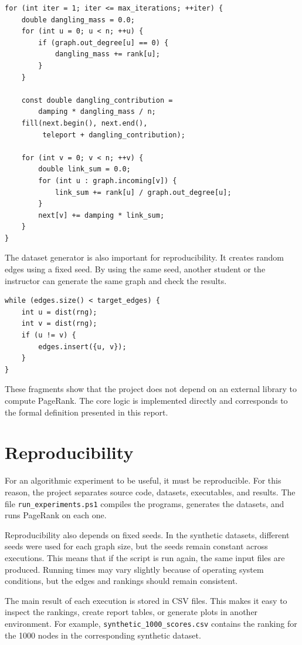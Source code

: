 \documentclass[runningheads]{llncs}
\begin{document}
\begin{verbatim}
for (int iter = 1; iter <= max_iterations; ++iter) {
    double dangling_mass = 0.0;
    for (int u = 0; u < n; ++u) {
        if (graph.out_degree[u] == 0) {
            dangling_mass += rank[u];
        }
    }

    const double dangling_contribution =
        damping * dangling_mass / n;
    fill(next.begin(), next.end(),
         teleport + dangling_contribution);

    for (int v = 0; v < n; ++v) {
        double link_sum = 0.0;
        for (int u : graph.incoming[v]) {
            link_sum += rank[u] / graph.out_degree[u];
        }
        next[v] += damping * link_sum;
    }
}
\end{verbatim}

The dataset generator is also important for reproducibility. It creates random edges using a fixed seed. By using the same seed, another student or the instructor can generate the same graph and check the results.

\begin{verbatim}
while (edges.size() < target_edges) {
    int u = dist(rng);
    int v = dist(rng);
    if (u != v) {
        edges.insert({u, v});
    }
}
\end{verbatim}

These fragments show that the project does not depend on an external library to compute PageRank. The core logic is implemented directly and corresponds to the formal definition presented in this report.

\section{Reproducibility}

For an algorithmic experiment to be useful, it must be reproducible. For this reason, the project separates source code, datasets, executables, and results. The file \texttt{run\_experiments.ps1} compiles the programs, generates the datasets, and runs PageRank on each one.

Reproducibility also depends on fixed seeds. In the synthetic datasets, different seeds were used for each graph size, but the seeds remain constant across executions. This means that if the script is run again, the same input files are produced. Running times may vary slightly because of operating system conditions, but the edges and rankings should remain consistent.

The main result of each execution is stored in CSV files. This makes it easy to inspect the rankings, create report tables, or generate plots in another environment. For example, \texttt{synthetic\_1000\_scores.csv} contains the ranking for the 1000 nodes in the corresponding synthetic dataset.
\end{document}
